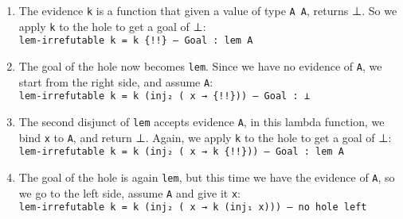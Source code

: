 \documentclass{lecturenotes}
\newcommand{\agdaempty}{\textsf{⊥}\xspace}
\begin{document}
\begin{itemize}
\begin{enumerate}
\item The evidence \texttt{k} is a function that given a value of type \texttt{A \uplus \lnot A},
      returns \agdaempty. So we apply \texttt{k} to the hole to get a goal of \agdaempty :
      \\ \texttt{lem-irrefutable k = k \{!!\} -- Goal : lem A} 

\item The goal of the hole now becomes \texttt{lem}. Since we have no evidence of \texttt{A},
      we start from the right side, and assume \texttt{\lnot A}:
      \\ \texttt{lem-irrefutable k = k (inj₂ (\lambda\ x → \{!!\})) -- Goal : \agdaempty}

\item The second disjunct of \texttt{lem} accepts evidence \texttt{\lnot A}, in this lambda function, we bind \texttt{x}
      to \texttt{A}, and return \agdaempty. Again, we apply \texttt{k} to the hole to get a goal of \agdaempty :
      \\ \texttt{lem-irrefutable k = k (inj₂ (\lambda\ x → k \{!!\})) -- Goal : lem A}

\item The goal of the hole is again \texttt{lem}, but this time we have the evidence of \texttt{A},
      so we go to the left side, assume \texttt{A} and give it \texttt{x}:
      \\ \texttt{lem-irrefutable k = k (inj₂ (\lambda\ x → k (inj₁ x))) -- no hole left}
\end{enumerate}
\end{itemize} %
\end{document}
